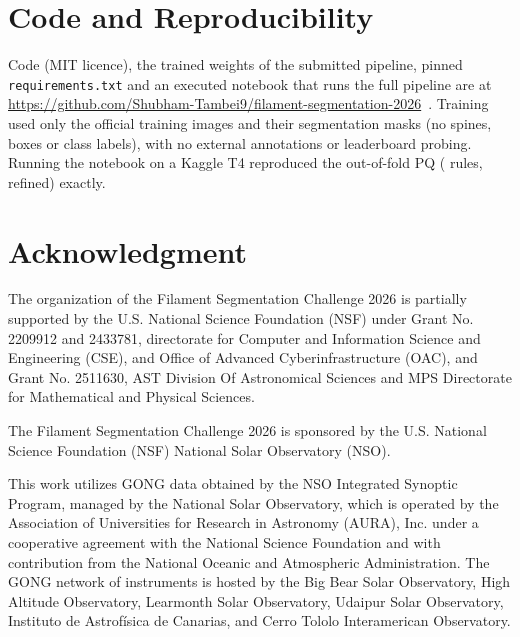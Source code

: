 \documentclass[sigconf]{acmart}
\begin{document}
\section{Code and Reproducibility}
Code (MIT licence), the trained weights of the submitted pipeline, pinned \texttt{requirements.txt} and an executed notebook that runs the full pipeline are at \url{https://github.com/Shubham-Tambei9/filament-segmentation-2026}~\cite{tambe2026code}. Training used only the official training images and their segmentation masks (no spines, boxes or class labels), with no external annotations or leaderboard probing. Running the notebook on a Kaggle T4 reproduced the out-of-fold PQ ( rules,  refined) exactly.


\section{Acknowledgment}\label{sec:acknowledgment}
    The organization of the Filament Segmentation Challenge 2026 is partially supported by the U.S. National Science Foundation (NSF) under Grant No. 2209912 and 2433781, directorate for Computer and Information Science and Engineering (CSE), and Office of Advanced Cyberinfrastructure (OAC), and Grant No. 2511630, AST Division Of Astronomical Sciences and MPS Directorate for Mathematical and Physical Sciences.

    The Filament Segmentation Challenge 2026 is sponsored by the U.S. National Science Foundation (NSF) National Solar Observatory (NSO).

    This work utilizes GONG data obtained by the NSO Integrated Synoptic Program, managed by the National Solar Observatory, which is operated by the Association of Universities for Research in Astronomy (AURA), Inc. under a cooperative agreement with the National Science Foundation and with contribution from the National Oceanic and Atmospheric Administration. The GONG network of instruments is hosted by the Big Bear Solar Observatory, High Altitude Observatory, Learmonth Solar Observatory, Udaipur Solar Observatory, Instituto de Astrofísica de Canarias, and Cerro Tololo Interamerican Observatory.



\end{document}
